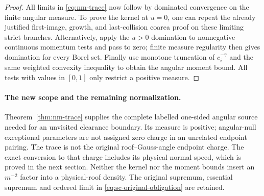 \begin{proof}
All limits in \eqref{eq:nm-trace} now follow by dominated
convergence on the finite angular measure.  To prove the kernel
at $u=0$, one can repeat the already justified first-image,
growth, and last-collision coarea proof on these limiting strict
branches.  Alternatively, apply the $u>0$ domination to
nonnegative continuous momentum tests and pass to zero; finite
measure regularity then gives domination for every Borel set.
Finally use monotone truncation of $c_i^{-\gamma}$ and the same
weighted convexity inequality to obtain the angular moment bound.
All tests with values in $[0,1]$ only restrict a positive measure.
\end{proof}

\paragraph{The new scope and the remaining normalization.}
Theorem~\ref{thm:nm-trace} supplies the complete labelled
one-sided angular source needed for an unvisited clearance
boundary.  Its measure is positive; angular-null exceptional
parameters are not assigned zero charge in an unrelated endpoint
pairing.  The trace is not the original roof--Gauss-angle endpoint
charge.  The exact conversion to that charge includes its physical
normal speed, which is proved in the next section.  Neither the
kernel nor the moment bounds insert an $m^{-2}$ factor into a
physical-roof density.  The original supremum, essential supremum
and ordered limit in \eqref{eq:sc-original-obligation} are retained.
